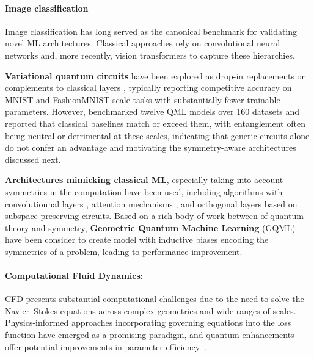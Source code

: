 \documentclass[aps,10pt,groupedaddress,prx,superscriptaddress,twocolumn,balancelastpage, tightenlines]{revtex4-2}
\theoremstyle{plain}  %
\begin{document}
\paragraph{Image classification}

Image classification has long served as the canonical benchmark for validating novel ML architectures. Classical approaches rely on convolutional neural networks and, more recently, vision transformers \cite{lecun1998mnist, vaswani_attention_2017} to capture these hierarchies.


\noindent\textbf{Variational quantum circuits} have been explored as drop-in replacements or complements to classical layers \cite{senokosov2024quantum, shi_quantum_2024, elhag_quantum_2025, liu2025lcqhnn, henderson2020quanv, he2016resnet, liu2021qccnn, long2025qcqcnn, bokhan2022qcnn_multiclass, fan2024qccnn, vu2024quanv, kawase2024dqnn, houssein2022covid, acar2022breast}, typically reporting competitive accuracy on MNIST and FashionMNIST-scale tasks with substantially fewer trainable parameters. However, \cite{bowles2024better} benchmarked twelve QML models over 160 datasets and reported that classical baselines match or exceed them, with entanglement often being neutral or detrimental at these scales, indicating that generic circuits alone do not confer an advantage and motivating the symmetry-aware architectures discussed next.

\noindent\textbf{Architectures mimicking classical ML}, especially taking into account symmetries in the computation have been used, including algorithms with convolutionnal layers \cite{kerenidis_quantum_2020, cong2019quantum, monbroussou_subspace_2025, monbroussou_photonic_2025}, attention mechanisms \cite{cherrat_quantum_2024}, and orthogonal layers \cite{landman_quantum_2022} based on subspace preserving circuits. Based on a rich body of work between of quantum theory and symmetry, \textbf{Geometric Quantum Machine Learning} (GQML) \cite{perrier_quantum_2020,  wiersema_geometric_2025,tuysuz_symmetry_2024, ragone_representation_2023} have been consider to create model with inductive biases encoding the symmetries of a problem, leading to performance improvement.



\paragraph{Computational Fluid Dynamics:} \Gls{CFD} presents substantial computational challenges due to the need to solve the Navier--Stokes equations across complex geometries and wide ranges of scales. Physics-informed approaches incorporating governing equations into the loss function have emerged as a promising paradigm, and quantum enhancements offer potential improvements in parameter efficiency~\cite{gaitan2020navier, amaral2026qmlcfdreview,
ye2024hybridcfd}.
\end{document}
